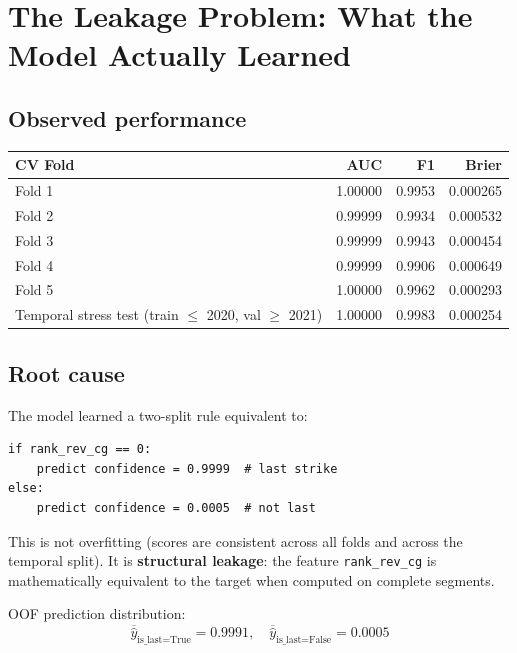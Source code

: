 \documentclass[12pt,a4paper]{article}
\begin{document}
\newpage

\section{The Leakage Problem: What the Model Actually Learned}

\subsection{Observed performance}

\begin{center}
\begin{tabular}{lrrr}
\toprule
\textbf{CV Fold} & \textbf{AUC} & \textbf{F1} & \textbf{Brier} \\
\midrule
Fold 1 & 1.00000 & 0.9953 & 0.000265 \\
Fold 2 & 0.99999 & 0.9934 & 0.000532 \\
Fold 3 & 0.99999 & 0.9943 & 0.000454 \\
Fold 4 & 0.99999 & 0.9906 & 0.000649 \\
Fold 5 & 1.00000 & 0.9962 & 0.000293 \\
\midrule
Temporal stress test (train $\leq$ 2020, val $\geq$ 2021) & 1.00000 & 0.9983 & 0.000254 \\
\bottomrule
\end{tabular}
\end{center}

\subsection{Root cause}

The model learned a two-split rule equivalent to:

\begin{lstlisting}
if rank_rev_cg == 0:
    predict confidence = 0.9999  # last strike
else:
    predict confidence = 0.0005  # not last
\end{lstlisting}

This is not overfitting (scores are consistent across all folds and across the temporal split). It is \textbf{structural leakage}: the feature \texttt{rank\_rev\_cg} is mathematically equivalent to the target when computed on complete segments.

OOF prediction distribution:
\[
  \overline{\hat{y}}_{\text{is\_last=True}} = 0.9991, \quad
  \overline{\hat{y}}_{\text{is\_last=False}} = 0.0005
\]
\end{document}

